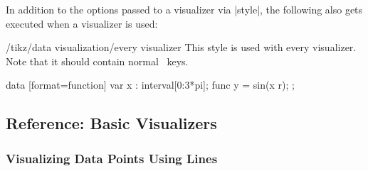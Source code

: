 In addition to the options passed to a visualizer via |style|, the following
also gets executed when a visualizer is used:

\begin{stylekey}{/tikz/data visualization/every visualizer}
    This style is used with every visualizer. Note that it should contain
    normal \tikzname\ keys.
\begin{codeexample}[
    width=7cm,
    preamble={\usetikzlibrary{datavisualization.formats.functions}},
]
\tikz \datavisualization
 [scientific axes=clean,
  every visualizer/.style={dashed},
  visualize as smooth line]
data [format=function] {
  var x : interval[0:3*pi];
  func y = sin(\value x r);
};
\end{codeexample}
\end{stylekey}


\subsection{Reference: Basic Visualizers}

\subsubsection{Visualizing Data Points Using Lines}

